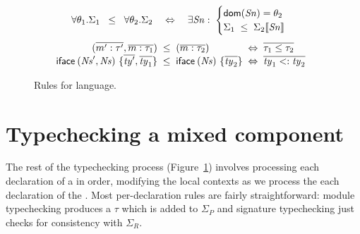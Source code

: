\begin{figure}[t]


\[
  \forall\theta_1.\Sigma_1 \;\;\le\;\; \forall\theta_2.\Sigma_2
  \quad\Leftrightarrow\quad
  \exists \mathit{Sn} :\;
    \begin{cases}
      \mathsf{dom}(\mathit{Sn}) = \theta_2 \\
      \Sigma_1 \;\le\; \Sigma_2\llbracket\mathit{Sn}\rrbracket
    \end{cases}
\]
\[
\begin{array}{@{}r@{\;\;}c@{\;\;}l@{\;\;}c@{\;\;}l}
  (\overline{m':\tau'},\overline{m:\tau_1})
    &\le&
    (\overline{m:\tau_2})
      &\Leftrightarrow&
      \overline{\tau_1 \le \tau_2}
  \\
  \UobjTau{\UNs',\UNs}{\overline{\Uty'},\overline{\Uty_1}}
    &\le&
    \UobjTau{\UNs}{\overline{\Uty_2}}
      &\Leftrightarrow&
      \overline{\Uty_1 <: \Uty_2}
\end{array}
\]

\caption{Rules for \unit{} language.}
\label{fig:unit-ty-rules}
\end{figure}

\section{Typechecking a mixed component}

The rest of the typechecking process (Figure~\ref{fig:unit-ty-rules})
involves processing each declaration of a \unit{} in order, modifying
the local contexts as we process the each declaration of the \unit{}.
Most per-declaration rules are fairly straightforward: module
typechecking produces a $\tau$ which is added to $\Sigma_P$ and signature
typechecking just checks for consistency with $\Sigma_R$.

